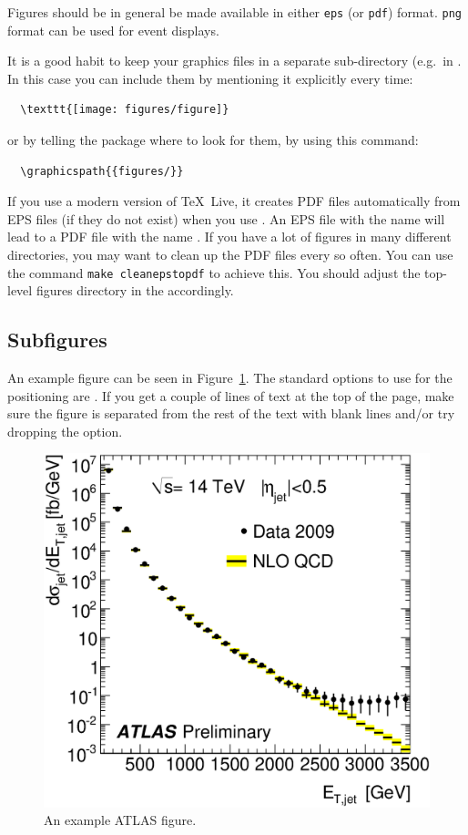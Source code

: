 Figures should be in general be made available in either \texttt{eps} (or \texttt{pdf}) format.
\texttt{png} format can be used for event displays.

It is a good habit to keep your graphics files in a separate
sub-directory (e.g.\ in . 
In this case you can include them by mentioning it explicitly every time:
\begin{verbatim}
  \texttt{[image: figures/figure]}
\end{verbatim}
or by telling the  package where to look
for them, by using this command:
\begin{verbatim}
  \graphicspath{{figures/}}
\end{verbatim}

If you use a modern version of \TeX\ Live, it creates PDF files automatically from EPS files
(if they do not exist) when you use .
An EPS file with the name  will lead to a PDF file with the name
.
If you have a lot of figures in many different directories, you may want to clean up the PDF files every so often.
You can use the command \verb|make cleanepstopdf| to achieve this.
You should adjust the top-level figures directory in the  accordingly.


\subsection{Subfigures}

An example figure can be seen in Figure~\ref{fig:example}.
The standard options to use for the positioning are .
If you get a couple of lines of text at the top of the page,
make sure the figure is separated from the rest of the text with blank lines and/or try dropping the  option.

\begin{figure}[htbp]
  \centering
  \includegraphics[width=0.5\columnwidth]{AtlasExample}
  \caption{An example ATLAS figure.}
  \label{fig:example}
\end{figure}

